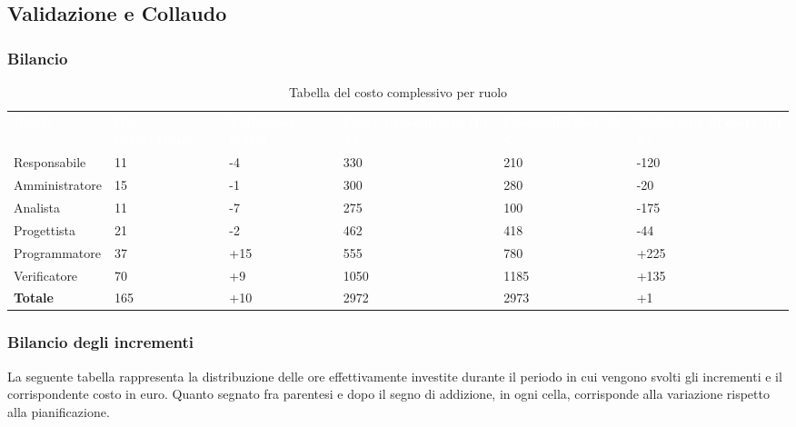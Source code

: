 \newpage
\subsection{Validazione e Collaudo}
\subsubsection{Bilancio}

{
\renewcommand{\arraystretch}{2}
\begin{longtable}[h]{ C{2.5cm} C{2.5cm} C{2.5cm} C{2.5cm} C{1.5cm} C{2.5cm}}
\caption{Tabella del costo complessivo per ruolo}\\

\textcolor{white}{\textbf{Ruolo}} & 
\textcolor{white}{\textbf{Ore preventivate}} & 
\textcolor{white}{\textbf{Variazione oraria}} & 
\textcolor{white}{\textbf{Costo preventivato (in \euro{})}} & 
\textcolor{white}{\textbf{Costo effettivo (in \euro{})}} & 
\textcolor{white}{\textbf{Variazione di costo (in \euro{})}}\\	
	
Responsabile    &  11 &  -4 &  330 &  210 & -120 \\
Amministratore  &  15 &  -1 &  300 &  280 &  -20 \\
Analista        &  11 &  -7 &  275 &  100 & -175 \\
Progettista     &  21 &  -2 &  462 &  418 &  -44 \\
Programmatore   &  37 & +15 &  555 &  780 & +225 \\
Verificatore    &  70 &  +9 & 1050 & 1185 & +135 \\
\textbf{Totale} & 165 & +10 & 2972 & 2973 &   +1 \\	

\end{longtable}
}

\subsubsection{Bilancio degli incrementi}
La seguente tabella rappresenta la distribuzione delle ore effettivamente investite durante il periodo in cui vengono svolti gli incrementi e il corrispondente costo in euro.
Quanto segnato fra parentesi e dopo il segno di addizione, in ogni cella, corrisponde alla variazione rispetto alla pianificazione.

